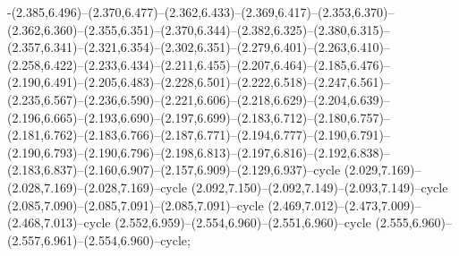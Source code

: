 -(2.385,6.496)--(2.370,6.477)--(2.362,6.433)--(2.369,6.417)--(2.353,6.370)--(2.362,6.360)--(2.355,6.351)--(2.370,6.344)--(2.382,6.325)--(2.380,6.315)--(2.357,6.341)--(2.321,6.354)--(2.302,6.351)--(2.279,6.401)--(2.263,6.410)--(2.258,6.422)--(2.233,6.434)--(2.211,6.455)--(2.207,6.464)--(2.185,6.476)--(2.190,6.491)--(2.205,6.483)--(2.228,6.501)--(2.222,6.518)--(2.247,6.561)--(2.235,6.567)--(2.236,6.590)--(2.221,6.606)--(2.218,6.629)--(2.204,6.639)--(2.196,6.665)--(2.193,6.690)--(2.197,6.699)--(2.183,6.712)--(2.180,6.757)--(2.181,6.762)--(2.183,6.766)--(2.187,6.771)--(2.194,6.777)--(2.190,6.791)--(2.190,6.793)--(2.190,6.796)--(2.198,6.813)--(2.197,6.816)--(2.192,6.838)--(2.183,6.837)--(2.160,6.907)--(2.157,6.909)--(2.129,6.937)--cycle (2.029,7.169)--(2.028,7.169)--(2.028,7.169)--cycle (2.092,7.150)--(2.092,7.149)--(2.093,7.149)--cycle (2.085,7.090)--(2.085,7.091)--(2.085,7.091)--cycle (2.469,7.012)--(2.473,7.009)--(2.468,7.013)--cycle (2.552,6.959)--(2.554,6.960)--(2.551,6.960)--cycle (2.555,6.960)--(2.557,6.961)--(2.554,6.960)--cycle;
